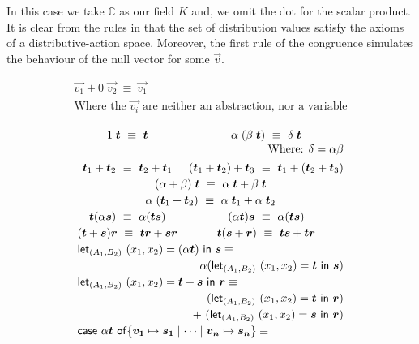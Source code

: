 \documentclass[runningheads,orivec]{llncs}
\def\C{\mathbb{C}}            %
\def\Pair#1#2{(#1,#2)} %
\def\letkeyword{\mathsf{let}}
\def\inkeyword{\mathsf{in}}
\def\LetP#1#2#3#4#5#6{\letkeyword_{\Pair{#2}{#4}}~\Pair{#1}{#3}=#5~\inkeyword~#6}
\def\gencase#1#2#3#4#5{\ensuremath{\mathsf{case}~#1~\mathsf{of} \{#2\mapsto #4 \mid \dotsb \mid #3\mapsto #5\}}}
\begin{document}
In this case we take $\C$ as our field $K$ and, we omit the dot for the scalar product. It is clear from the rules in  that the set of distribution values satisfy the axioms of a distributive-action space. Moreover, the first rule of the congruence simulates the behaviour of the null vector for some $\vec{v}$. 

\begin{table*}[tb]
  \small
  \vspace*{0.2cm}
  \[
    \begin{array}{l}
      \vec{v_1} + 0\; \vec{v_2}~\equiv~\vec{v_1}\\  
      \text{Where the $\vec{v_i}$ are neither an abstraction, nor a variable}
    \end{array}   
  \]
  
  \[\renewcommand*{\arraystretch}{1.2}
    \begin{array}{c c}
      1\;\vec{t}~\equiv~\vec{t}&
      \alpha\;(\beta\;\vec{t})~\equiv~\delta\;\vec{t}\\[-2pt]
      \multicolumn{2}{r}{\text{Where: } \delta = \alpha\beta}\\[2pt]
      \vec{t}_1+\vec{t}_2 ~\equiv~\vec{t}_2+\vec{t}_1 &
      (\vec{t}_1+\vec{t}_2)+\vec{t}_3~\equiv~\vec{t}_1+(\vec{t}_2+\vec{t}_3)\\
      \multicolumn{2}{c}{(\alpha+\beta)\;\vec{t}~\equiv~\alpha\;\vec{t}+\beta\;\vec{t}}\\
      \multicolumn{2}{c}{\alpha\;(\vec{t}_1+\vec{t}_2)~\equiv~\alpha\;\vec{t}_1+\alpha\;\vec{t}_2}\\
      \vec t (\alpha \vec s)~\equiv~ \alpha (\vec{t}\vec{s})&
      (\alpha \vec t) \vec s ~\equiv~ \alpha (\vec{t}\vec{s})\\
      (\vec t + \vec s) \vec{r}~\equiv~\vec{t}\vec{r} + \vec{s}\vec{r} &
      \vec t(\vec{s}+\vec{r})~\equiv~\vec{t}\vec{s} + \vec{t}\vec{r}\\
      \multicolumn{2}{l}{\LetP{x_1}{A_1}{x_2}{B_2}{(\alpha\vec{t})}{\vec{s}}\equiv}\\
      \multicolumn{2}{r}{\alpha(\LetP{x_1}{A_1}{x_2}{B_2}{\vec{t}}{\vec{s}})}\\
      \multicolumn{2}{l}{\LetP{x_1}{A_1}{x_2}{B_2}{\vec{t}+\vec{s}}{\vec{r}}\equiv}\\
      \multicolumn{2}{r}{(\LetP{x_1}{A_1}{x_2}{B_2}{\vec{t}}{\vec{r}})}\\
      \multicolumn{2}{r}{+~(\LetP{x_1}{A_1}{x_2}{B_2}{\vec{s}}{\vec{r}})}\\
      \multicolumn{2}{l}{\gencase{\alpha \vec{t}}{\vec{v_1}}{\vec{v_n}}{\vec{s_1}}{\vec{s_n}}\equiv}\\

\end{array}\]
\end{table*}
\end{document}
